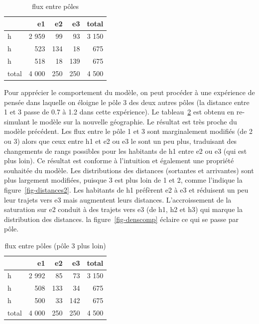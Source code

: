 \documentclass[
  10pt,
  a4paper,
  numbers=noendperiod,
  DIV=9]{scrreprt}
\begin{document}
\hypertarget{tbl-fluxpoles}{}
\begin{longtable}{lrrrr}
\caption{\label{tbl-fluxpoles}flux entre pôles }\tabularnewline

\toprule
 & e1 & e2 & e3 & total \\ 
\midrule
h & 2 959 & 99 & 93 & 3 150 \\ 
h & 523 & 134 & 18 & 675 \\ 
h & 518 & 18 & 139 & 675 \\ 
total & 4 000 & 250 & 250 & 4 500 \\ 
\bottomrule
\end{longtable}

Pour apprécier le comportement du modèle, on peut procéder à une
expérience de pensée dans laquelle on éloigne le pôle 3 des deux autres
pôles (la distance entre 1 et 3 passe de 0.7 à 1.2 dans cette
expérience). Le tableau~\ref{tbl-fluxpoles2} est obtenu en re-simulant
le modèle sur la nouvelle géographie. Le résultat est très proche du
modèle précédent. Les flux entre le pôle 1 et 3 sont marginalement
modifiés (de 2 ou 3) alors que ceux entre h1 et e2 ou e3 le sont un peu
plus, traduisant des changements de rangs possibles pour les habitants
de h1 entre e2 ou e3 (qui est plus loin). Ce résultat est conforme à
l'intuition et également une propriété souhaitée du modèle. Les
distributions des distances (sortantes et arrivantes) sont plus
largement modifiées, puisque 3 est plus loin de 1 et 2, comme l'indique
la figure~\ref{fig-distances2}. Les habitants de h1 préfèrent e2 à e3 et
réduisent un peu leur trajets vers e3 mais augmentent leurs distances.
L'accroissement de la saturation sur e2 conduit à des trajets vers e3
(de h1, h2 et h3) qui marque la distribution des distances. la
figure~\ref{fig-denscomp} éclaire ce qui se passe par pôle.

\hypertarget{tbl-fluxpoles2}{}
\begin{longtable}{lrrrr}
\caption{\label{tbl-fluxpoles2}flux entre pôles (pôle 3 plus loin) }\tabularnewline

\toprule
 & e1 & e2 & e3 & total \\ 
\midrule
h & 2 992 & 85 & 73 & 3 150 \\ 
h & 508 & 133 & 34 & 675 \\ 
h & 500 & 33 & 142 & 675 \\ 
total & 4 000 & 250 & 250 & 4 500 \\ 
\bottomrule
\end{longtable}
\end{document}
